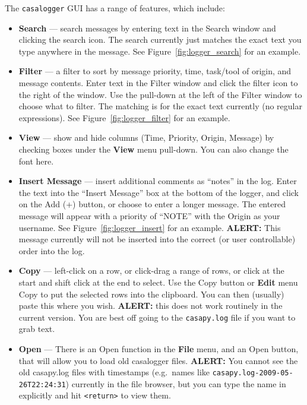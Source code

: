 The {\tt casalogger} GUI has a range of features, which include:
\begin{itemize}
\item {\bf Search} --- search messages by entering text in the Search
window and clicking the search icon.  The search currently just
matches the exact text you type anywhere in the message.  See 
Figure~\ref{fig:logger_search} for an example.

\item {\bf Filter} --- a filter to sort by message priority, time,
task/tool of origin, and message contents.  Enter text in the
Filter window and click the filter icon to the right of the window.
Use the pull-down at the left of the Filter window to choose what
to filter.  The matching is for the exact text currently (no regular
expressions).  See 
Figure~\ref{fig:logger_filter} for an example.

\item {\bf View} --- show and hide columns (Time, Priority, Origin,
Message) by checking boxes under the {\bf View} menu pull-down.  You
can also change the font here.

\item {\bf Insert Message} --- insert additional comments as ``notes''
in the log.  Enter the text into the ``Insert Message'' box at the
bottom of the logger, and click on the Add (+) button, or choose to
enter a longer message.  The entered message will appear with a
priority of ``NOTE'' with the Origin as your username.  See
Figure~\ref{fig:logger_insert} for an example. {\bf ALERT:} This
message currently will not be inserted into the correct (or user
controllable) order into the log.

\item {\bf Copy} --- left-click on a row, or click-drag a
range of rows, or click at the start and shift click at the end to
select.  Use the Copy button or {\bf Edit} menu Copy to put the
selected rows into the clipboard.  You can then (usually) paste this
where you wish.  {\bf ALERT:} this does not work routinely in the
current version.  You are best off going to the {\tt casapy.log} file
if you want to grab text.

\item {\bf Open} --- There is an Open function in the
{\bf File} menu, and an Open button, that will allow you to load old
casalogger files. {\bf ALERT:} You cannot see the old casapy.log
files with timestamps (e.g.\ names like
{\tt casapy.log-2009-05-26T22:24:31}) currently in the file browser,
but you can type the name in explicitly and hit {\tt <return>} to
view them.

\end{itemize}

